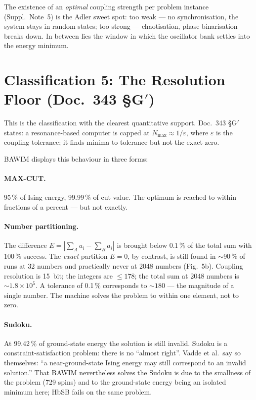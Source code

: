 The existence of an \emph{optimal} coupling strength per problem instance
(Suppl.\ Note~5) is the Adler sweet spot: too weak --- no synchronisation,
the system stays in random states; too strong --- chaotisation, phase
binarisation breaks down. In between lies the window in which the
oscillator bank settles into the energy minimum. \SM

\section{Classification 5: The Resolution Floor (Doc.~343 §G$'$)}

This is the classification with the clearest quantitative support.
Doc.~343 §G$'$ states: a resonance-based computer is capped at
$N_{\max}\approx1/\varepsilon$, where $\varepsilon$ is the coupling
tolerance; it finds minima to tolerance but not the exact zero. \BM

BAWIM displays this behaviour in three forms:

\paragraph{MAX-CUT.} 95\,\% of Ising energy, 99.99\,\% of cut value. The
optimum is reached to within fractions of a percent --- but not exactly.

\paragraph{Number partitioning.} The difference
$E=|\sum_{A}a_i-\sum_{B}a_i|$ is brought below $0.1\,\%$ of the total sum
with 100\,\% success. The \emph{exact} partition $E=0$, by contrast, is
still found in $\sim$90\,\% of runs at 32 numbers and practically never at
2048 numbers (Fig.~5b). Coupling resolution is 15~bit; the integers are
$\le178$; the total sum at 2048 numbers is $\sim1.8\times10^5$. A tolerance
of 0.1\,\% corresponds to $\sim180$ --- the magnitude of a single number.
The machine solves the problem to within one element, not to zero.

\paragraph{Sudoku.} At 99.42\,\% of ground-state energy the solution is
still invalid. Sudoku is a constraint-satisfaction problem: there is no
``almost right''. Vadde et al.\ say so themselves: ``a near-ground-state
Ising energy may still correspond to an invalid solution.'' That BAWIM
nevertheless solves the Sudoku is due to the smallness of the problem (729
spins) and to the ground-state energy being an isolated minimum here; HbSB
fails on the same problem.


